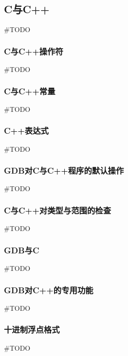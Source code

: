 \subsection{C与C++}
\#TODO

\subsubsection{C与C++操作符}
\#TODO

\subsubsection{C与C++常量}
\#TODO

\subsubsection{C++表达式}
\#TODO

\subsubsection{GDB对C与C++程序的默认操作}
\#TODO

\subsubsection{C与C++对类型与范围的检查}
\#TODO

\subsubsection{GDB与C}
\#TODO

\subsubsection{GDB对C++的专用功能}
\#TODO

\subsubsection{十进制浮点格式}
\#TODO
